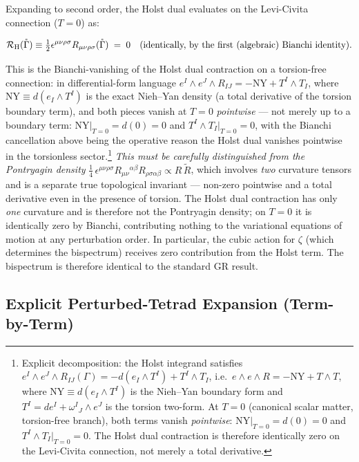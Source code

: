 \documentclass[aps,prd,twocolumn,superscriptaddress,showpacs,preprintnumbers,nofootinbib,longbibliography,floatfix]{revtex4-2}
\begin{document}
Expanding to second order, the Holst dual evaluates on the Levi-Civita
connection ($T=0$) as:
\begin{widetext}
\begin{equation}
\mathcal{R}_{\rm H}(\mathring{\Gamma}) \equiv \tfrac{1}{2}\epsilon^{\mu\nu\rho\sigma}
R_{\mu\nu\rho\sigma}(\mathring{\Gamma}) \;=\; 0
\quad\text{(identically, by the first (algebraic) Bianchi identity)}.
\end{equation}
\end{widetext}
This is the Bianchi-vanishing of the Holst dual contraction on a torsion-free
connection: in differential-form language $e^I\wedge e^J\wedge R_{IJ} =
-\mathrm{NY} + T^I\wedge T_I$, where $\mathrm{NY} \equiv d(e_I\wedge T^I)$
is the exact Nieh--Yan density (a total derivative of the torsion boundary
term), and both pieces vanish at $T=0$ \emph{pointwise} --- not merely up
to a boundary term: $\mathrm{NY}|_{T=0} = d(0) = 0$ and $T^I\wedge T_I|_{T=0}
= 0$, with the Bianchi cancellation above being the operative reason the
Holst dual vanishes pointwise in the torsionless sector.\footnote{\label{fn:NY_decomp}%
Explicit decomposition: the Holst integrand satisfies
$e^I\wedge e^J\wedge R_{IJ}(\Gamma) = -d(e_I\wedge T^I) + T^I\wedge T_I$,
i.e.\ $e\wedge e\wedge R = -\mathrm{NY} + T\wedge T$,
where $\mathrm{NY}\equiv d(e_I\wedge T^I)$ is the Nieh--Yan boundary form
and $T^I = de^I + \omega^I{}_J\wedge e^J$ is the torsion two-form.
At $T=0$ (canonical scalar matter, torsion-free branch), both terms vanish
\emph{pointwise}: $\mathrm{NY}|_{T=0} = d(0) = 0$ and $T^I\wedge T_I|_{T=0} = 0$.
The Holst dual contraction is therefore identically zero on the Levi-Civita
connection, not merely a total derivative.} \emph{This must be carefully
distinguished from the Pontryagin density}
$\frac{1}{4}\,\epsilon^{\mu\nu\rho\sigma}R_{\mu\nu}{}^{\alpha\beta}
R_{\rho\sigma\alpha\beta} \propto R\,\widetilde R$, which involves \emph{two}
curvature tensors and is a separate true topological invariant ---
non-zero pointwise and a total derivative even in the presence of torsion.
The Holst dual contraction has only \emph{one} curvature and is therefore not
the Pontryagin density; on $T=0$ it is identically zero by Bianchi, contributing
nothing to the variational equations of motion at any perturbation order. In
particular, the cubic action for $\zeta$ (which determines the bispectrum)
receives zero contribution from the Holst term. The bispectrum is therefore
identical to the standard GR result.

\subsection{Explicit Perturbed-Tetrad Expansion (Term-by-Term)}\label{sec:transp_expansion}
\end{document}
